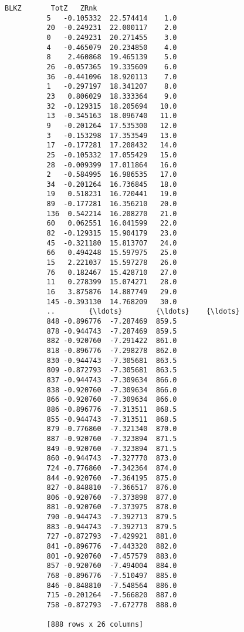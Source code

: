 \documentclass[11pt]{article}
\begin{document}
\begin{Verbatim}[commandchars=\\\{\}]
                   BLKZ       TotZ   ZRnk  
          5   -0.105332  22.574414    1.0  
          20  -0.249231  22.000117    2.0  
          0   -0.249231  20.271455    3.0  
          4   -0.465079  20.234850    4.0  
          8    2.460868  19.465139    5.0  
          26  -0.057365  19.335609    6.0  
          36  -0.441096  18.920113    7.0  
          1   -0.297197  18.341207    8.0  
          23   0.806029  18.333364    9.0  
          32  -0.129315  18.205694   10.0  
          13  -0.345163  18.096740   11.0  
          9   -0.201264  17.535300   12.0  
          3   -0.153298  17.353549   13.0  
          17  -0.177281  17.208432   14.0  
          25  -0.105332  17.055429   15.0  
          28  -0.009399  17.011864   16.0  
          2   -0.584995  16.986535   17.0  
          34  -0.201264  16.736845   18.0  
          19   0.518231  16.720441   19.0  
          89  -0.177281  16.356210   20.0  
          136  0.542214  16.208270   21.0  
          60   0.062551  16.041599   22.0  
          82  -0.129315  15.904179   23.0  
          45  -0.321180  15.813707   24.0  
          66   0.494248  15.597975   25.0  
          15   2.221037  15.597278   26.0  
          76   0.182467  15.428710   27.0  
          11   0.278399  15.074271   28.0  
          16   3.875876  14.887749   29.0  
          145 -0.393130  14.768209   30.0  
          ..        {\ldots}        {\ldots}    {\ldots}  
          848 -0.896776  -7.287469  859.5  
          878 -0.944743  -7.287469  859.5  
          882 -0.920760  -7.291422  861.0  
          818 -0.896776  -7.298278  862.0  
          830 -0.944743  -7.305681  863.5  
          809 -0.872793  -7.305681  863.5  
          837 -0.944743  -7.309634  866.0  
          838 -0.920760  -7.309634  866.0  
          866 -0.920760  -7.309634  866.0  
          886 -0.896776  -7.313511  868.5  
          855 -0.944743  -7.313511  868.5  
          879 -0.776860  -7.321340  870.0  
          887 -0.920760  -7.323894  871.5  
          849 -0.920760  -7.323894  871.5  
          860 -0.944743  -7.327770  873.0  
          724 -0.776860  -7.342364  874.0  
          844 -0.920760  -7.364195  875.0  
          827 -0.848810  -7.366517  876.0  
          806 -0.920760  -7.373898  877.0  
          881 -0.920760  -7.373975  878.0  
          790 -0.944743  -7.392713  879.5  
          883 -0.944743  -7.392713  879.5  
          727 -0.872793  -7.429921  881.0  
          841 -0.896776  -7.443320  882.0  
          801 -0.920760  -7.457579  883.0  
          857 -0.920760  -7.494004  884.0  
          768 -0.896776  -7.510497  885.0  
          846 -0.848810  -7.548564  886.0  
          715 -0.201264  -7.566820  887.0  
          758 -0.872793  -7.672778  888.0  
          
          [888 rows x 26 columns]
\end{Verbatim}
            
\end{document}
